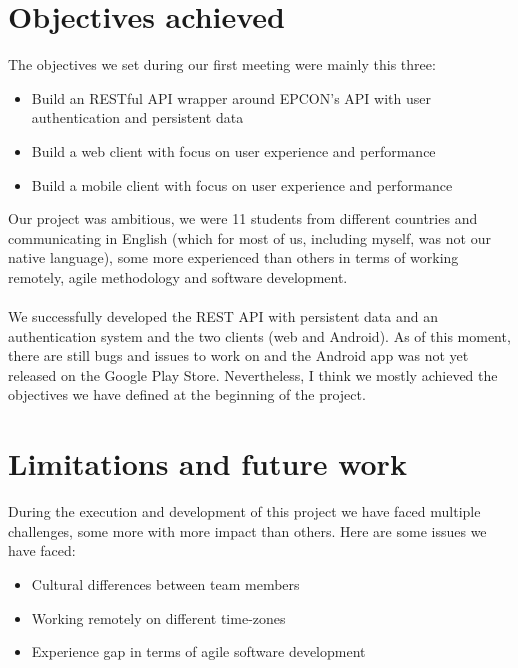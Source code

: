 \section{Objectives achieved}

The objectives we set during our first meeting were mainly this three:

\begin{itemize}

\item
Build an RESTful API wrapper around EPCON's API with user authentication and persistent data
\item 
Build a web client with focus on user experience and performance
\item 
Build a mobile client with focus on user experience and performance

\end{itemize}

Our project was ambitious, we were 11 students from different countries and communicating in English (which for most of us, including myself, was not our native language), some more experienced than others in terms of working remotely, agile methodology and software development.
\\ \\
We successfully developed the REST API with persistent data and an authentication system and the two clients (web and Android). As of this moment, there are still bugs and issues to work on and the Android app was not yet released on the Google Play Store. Nevertheless, I think we mostly achieved the objectives we have defined at the beginning of the project.

\section{Limitations and future work}

During the execution and development of this project we have faced multiple challenges, some more with more impact than others. Here are some issues we have faced:

\begin{itemize}

\item
Cultural differences between team members
\item 
Working remotely on different time-zones
\item 
Experience gap in terms of agile software development

\end{itemize}

